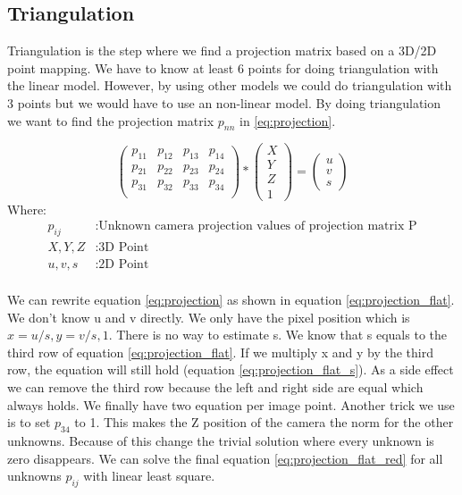 \documentclass[11pt,a4paper,titlepage,oneside]{report}
\begin{document}
\subsection{Triangulation}\label{sec:triangulation}

Triangulation is the step where we find a projection matrix based on a 3D/2D point mapping. We have to know at least 6 points for doing triangulation with the linear model. However, by using other models we could do triangulation with 3 points but we would have to use an non-linear model. By doing triangulation we want to find the projection matrix $p_{nn}$ in \ref{eq:projection}.

\begin{equation}\label{eq:projection}
	\begin{pmatrix}p_{11} & p_{12} & p_{13} & p_{14}\\
		p_{21} & p_{22} & p_{23} & p_{24}\\
		p_{31} & p_{32} & p_{33} & p_{34}\\
	\end{pmatrix}*
	\begin{pmatrix}
		X \\
		Y \\
		Z \\
		1
	\end{pmatrix}=
	\begin{pmatrix}
		u \\
		v \\
		s
  \end{pmatrix}
\end{equation}
Where:
\begin{align*}
	p_{ij}		&: \text{Unknown camera projection values of projection matrix P}\\
	X,Y,Z			&: \text{3D Point}\\
	u,v,s			&: \text{2D Point}\\
\end{align*}

We can rewrite equation \ref{eq:projection} as shown in equation \ref{eq:projection_flat}. We don't know u and v directly. We only have the pixel position which is $x=u/s, y=v/s, 1$. There is no way to estimate s. We know that s equals to the third row of equation \ref{eq:projection_flat}. If we multiply x and y by the third row, the equation will still hold (equation \ref{eq:projection_flat_s}). As a side effect we can remove the third row because the left and right side are equal which always holds. We finally have two equation per image point. Another trick we use is to set $p_{34}$ to 1. This makes the Z position of the camera the norm for the other unknowns. Because of this change the trivial solution where every unknown is zero disappears. We can solve the final equation \ref{eq:projection_flat_red} for all unknowns $p_{ij}$ with linear least square.
\end{document}
